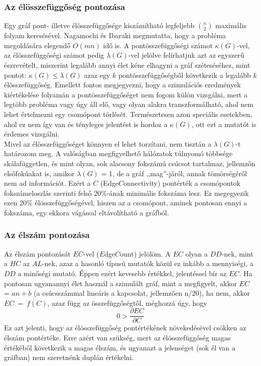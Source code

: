     \subsubsection{Az élösszefüggőség pontozása}\label{elossze}
    Egy gráf pont- illetve élösszefüggősége kiszámítható legfeljebb $\binom{n}{2}$ maximális folyam keresésével. Nagamochi és Ibaraki megmutatta, hogy a probléma megoldására elegendő $O(mn)$ idő is\cite{Nagamochi96}. A pontösszefüggőségi számot $\kappa(G)$-vel, az élösszefüggőségi számot pedig $\lambda(G)$-vel jelölve felírhatjuk azt az egyszerű észrevételt, miszerint legalább annyi élet kéne elhagyni a gráf széteséséhez, mint pontot: $\kappa(G) \leq \lambda(G)$ azaz egy $k$ pontösszefüggőségből következik a legalább $k$ élösszefüggőség. Emellett fontos megjegyezni, hogy a szimulációs eredmények kiértékelése folyamán a pontösszefüggőséget nem fogom külön vizsgálni, mert a legtöbb probléma vagy úgy áll elő, vagy olyan alakra transzformálható, ahol nem lehet értelmezni egy csomópont törlését. Természetesen azon speciális esetekben, ahol ez nem így van és tényleges jelentést is hordoz a $\kappa(G)$, ott ezt a mutatót is érdemes vizsgálni.\\

    Mivel az élösszefüggőséget könnyen el lehet torzítani, nem tisztán a $\lambda(G)$-t határozom meg. A valóságban megfigyelhető hálózatok túlnyomó többsége skálafüggetlen, és mint olyan, sok alacsony fokszámú csúcsot tartalmaz, jellemzőn elsőfokúakat is, amikor $\lambda(G)$ = 1, de a gráf ,,mag''-járól, annak tömörségéről nem ad információt. Ezért a $C$ (Edge$C$onnectivity) pontérték a csomópontok fokszámeloszlás szerinti felső 20\%-ának minimális fokszáma lesz. Ez megegyezik ezen 20\% élösszefüggőségével, hiszen az a csomópont, aminek pontosan ennyi a fokszáma, egy ekkora vágással eltávolítható a gráfból.

    \subsubsection{Az élszám pontozása}
    Az élszám pontozását $EC$-vel ($E$dge$C$ount) jelölöm. A $EC$ olyan a $DD$-nek, mint a $HC$ az $AL$-nek, azaz a hasonló típusú mutatók közül ez inkább a mennyiségi, a $DD$ a minőségi mutató. Éppen ezért kevesebb értékkel, jelentéssel bír az $EC$. Ha pontosan ugyanannyi élet használ a szimulált gráf, mint a megfigyelt, akkor $EC$ = $an + b$ (a csúcsszámmal lineáris a kapcsolat, jellemzően n/20), ha nem, akkor $EC~=~f(C)$, azaz függ az összefüggőségtől, méghozzá úgy, hogy
    $$0 > \frac{\partial EC}{\partial C}$$
    Ez azt jelenti, hogy az élösszefüggőség pontértékének növekedésével csökken az élszám pontértéke. Erre azért van szükség, mert az élösszefüggőség magas értékéből következik a magas élszám, és ugyanazt a jelenséget (sok él van a gráfban) nem szeretnénk duplán értékelni.


